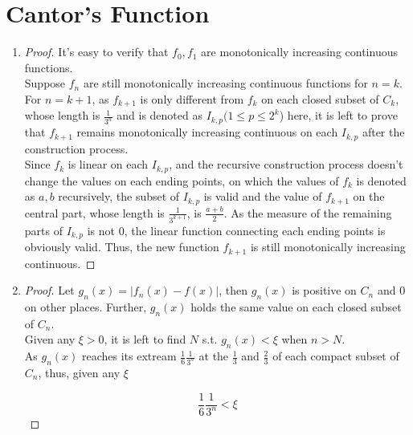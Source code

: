 \documentclass[paper=a4, fontsize=11pt]{scrartcl} %
\numberwithin{equation}{section} %
\numberwithin{figure}{section} %
\numberwithin{table}{section} %
\begin{document}
\section{Cantor's Function}
	\begin{enumerate}
		\item
			\begin{proof}
				It's easy to verify that $f_0, f_1$ are monotonically increasing continuous functions.\\
				Suppose $f_n$ are still monotonically increasing continuous functions for $ n = k$.\\
				For $n = k+1$, as $f_{k+1}$ is only different from $f_k$ on each closed subset of $C_k$, whose length is $\frac{1}{3^n}$ and is denoted as $I_{k, p} (1\leq p \leq 2^k$) here, it is left to prove that $f_{k+1}$ remains  monotonically increasing continuous on each $I_{k, p}$ after the construction process.\\
				Since $f_k$ is linear on each $I_{k, p}$, and the recursive construction process doesn't change the values on each ending points, on which the values of $f_k$ is denoted as $a, b$ recursively, the subset of $I_{k, p}$ is valid and the value of $f_{k+1}$ on the central part, whose length is $\frac{1}{3^{k+1}}$, is $\frac{a+b}{2}$. As the measure of the remaining parts of $I_{k, p}$ is not 0, the linear function connecting each ending points is obviously valid. Thus, the new function $f_{k+1}$ is still  monotonically increasing continuous.
			\end{proof}
		\item
			\begin{proof}
				Let $g_n(x) = \vert f_n(x) - f(x) \vert$, then $g_n(x)$ is positive on $C_n$ and 0 on other places. Further, $g_n(x)$ holds the same value on each closed subset of $C_n$.\\
				Given any $\xi > 0$, it is left to find $N$ s.t. $g_n(x) < \xi$ when $n > N$. \\
				As $g_n(x)$ reaches its extream $\frac{1}{6} \frac{1}{3^n}$ at the $\frac{1}{3}$ and $\frac{2}{3}$ of each compact subset of $C_n$, thus, given any $\xi$
				
				\begin{equation}
					\frac{1}{6} \frac{1}{3^n} < \xi
				\end{equation}
				

\end{proof}
\end{enumerate}
\end{document}
